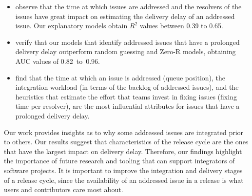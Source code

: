 \begin{itemize}
		\item observe that the time at which issues are addressed and the
			resolvers of the issues have great impact on estimating
			the delivery delay of an addressed issue.  Our explanatory
			models obtain $R^2$ values between 0.39 to 0.65. \\

		\item verify that our models that identify addressed issues that
			have a prolonged delivery delay outperform random
			guessing and Zero-R models, obtaining AUC values of 0.82~to~0.96.\\

		\item find that the time at which an issue is addressed (queue
			position), the integration workload (in terms of the
			backlog of addressed issues), and the
			heuristics that estimate the effort that teams invest in
			fixing issues (fixing time per resolver), are the
			most influential attributes for issues that have 
			a prolonged delivery delay. \\

	\end{itemize}

Our work provides insights as to why some addressed issues are integrated prior
to others. Our results suggest that characteristics of the release cycle are the
ones that have the largest impact on delivery delay. Therefore, our findings
highlight the importance of future research and tooling that can support
integrators of software projects. It is important to improve the integration and
delivery stages of a release cycle, since the availability of an addressed issue
in a release is what users and contributors care most about. 

